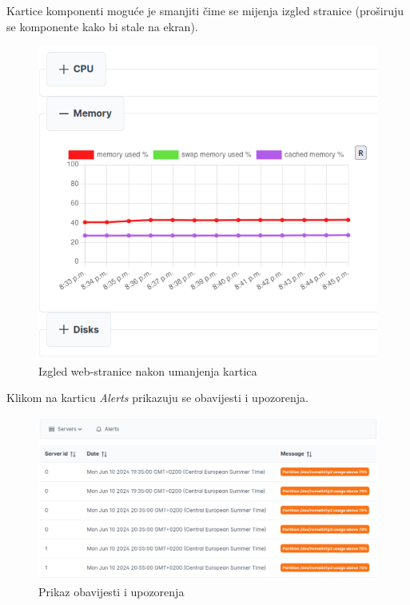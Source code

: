 \documentclass[zavrsnirad]{fer}
\begin{document}
Kartice komponenti moguće je smanjiti čime se mijenja izgled stranice (proširuju se komponente kako bi stale na ekran).
\begin{figure}[htb]
	\centering
	\includegraphics[width=0.75\linewidth]{images/web_4.png} 
	\caption{Izgled web-stranice nakon umanjenja kartica}
\end{figure}
\FloatBarrier

Klikom na karticu \textit{Alerts} prikazuju se obavijesti i upozorenja.
\begin{figure}[htb]
	\centering
	\includegraphics[width=0.9\linewidth]{images/web_5.png} 
	\caption{Prikaz obavijesti i upozorenja}
\end{figure}
\FloatBarrier
\end{document}
